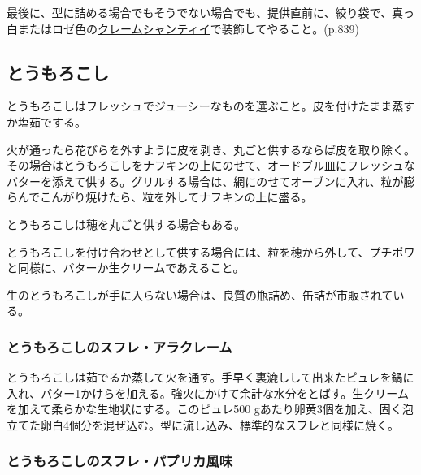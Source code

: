 最後に、型に詰める場合でもそうでない場合でも、提供直前に、絞り袋で、真っ白またはロゼ色の\protect\hyperlink{creme-chantilly}{クレームシャンティイ}で装飾してやること。(p.839)

\hypertarget{mais}{%
\subsection{とうもろこし}\label{mais}}

とうもろこしはフレッシュでジューシーなものを選ぶこと。皮を付けたまま蒸すか塩茹でする。

火が通ったら花びらを外すように皮を剥き、丸ごと供するならば皮を取り除く。その場合はとうもろこしをナフキンの上にのせて、オードブル皿にフレッシュなバターを添えて供する。グリルする場合は、網にのせてオーブンに入れ、粒が膨らんでこんがり焼けたら、粒を外してナフキンの上に盛る。

とうもろこしは穂を丸ごと供する場合もある。

とうもろこしを付け合わせとして供する場合には、粒を穂から外して、プチポワと同様に、バターか生クリームであえること。

生のとうもろこしが手に入らない場合は、良質の瓶詰め、缶詰が市販されている。

\hypertarget{souffle-de-mais-a-la-creme}{%
\subsubsection{とうもろこしのスフレ・アラクレーム}\label{souffle-de-mais-a-la-creme}}



とうもろこしは茹でるか蒸して火を通す。手早く裏漉しして出来たピュレを鍋に入れ、バター1かけらを加える。強火にかけて余計な水分をとばす。生クリームを加えて柔らかな生地状にする。このピュレ500
gあたり卵黄3個を加え、固く泡立てた卵白4個分を混ぜ込む。型に流し込み、標準的なスフレと同様に焼く。

\hypertarget{souffle-de-mais-au-paprika}{%
\subsubsection{とうもろこしのスフレ・パプリカ風味}\label{souffle-de-mais-au-paprika}}

